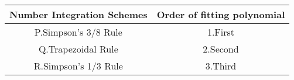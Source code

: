 \begin{center}
\begin{tabular}[12pt]{|c|c|}

\hline 
   {Number Integration Schemes} & {Order of fitting polynomial} \\ \hline
  P.Simpson's 3/8 Rule   & 1.First \\ \hline
  Q.Trapezoidal Rule    & 2.Second \\ \hline
  R.Simpson's 1/3 Rule &  3.Third  \\ \hline
 \end{tabular}
\end{center}

